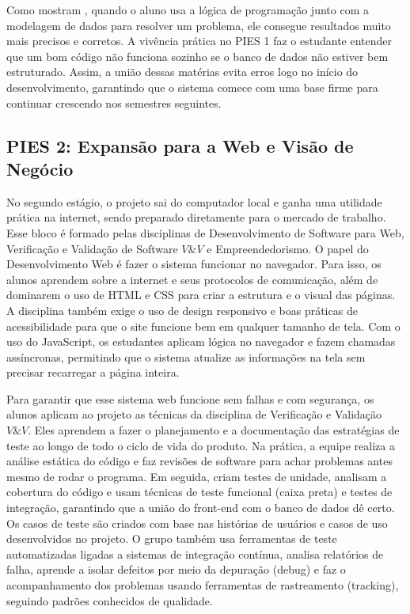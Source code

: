 Como mostram , quando o aluno usa a lógica de programação
junto com a modelagem de dados para resolver um problema, ele consegue
resultados muito mais precisos e corretos. A vivência prática no PIES 1 faz o
estudante entender que um bom código não funciona sozinho se o banco de dados
não estiver bem estruturado. Assim, a união dessas matérias evita erros logo no
início do desenvolvimento, garantindo que o sistema comece com uma base firme
para continuar crescendo nos semestres seguintes.

\subsection{ PIES 2: Expansão para a Web e Visão de Negócio} \label{sec:pies-2}

No segundo estágio, o projeto sai do computador local e ganha uma utilidade
prática na internet, sendo preparado diretamente para o mercado de trabalho.
Esse bloco é formado pelas disciplinas de Desenvolvimento de Software para Web,
Verificação e Validação de Software \(V\&V\) e Empreendedorismo. O papel do
Desenvolvimento Web é fazer o sistema funcionar no navegador. Para isso, os
alunos aprendem sobre a internet e seus protocolos de comunicação, além de
dominarem o uso de HTML e CSS para criar a estrutura e o visual das páginas. A
disciplina também exige o uso de design responsivo e boas práticas de
acessibilidade para que o site funcione bem em qualquer tamanho de tela. Com o
uso do JavaScript, os estudantes aplicam lógica no navegador e fazem chamadas
assíncronas, permitindo que o sistema atualize as informações na tela sem
precisar recarregar a página inteira.

Para garantir que esse sistema web funcione sem falhas e com segurança, os
alunos aplicam ao projeto as técnicas da disciplina de Verificação e Validação
\(V\&V\). Eles aprendem a fazer o planejamento e a documentação das estratégias
de teste ao longo de todo o ciclo de vida do produto. Na prática, a equipe
realiza a análise estática do código e faz revisões de software para achar
problemas antes mesmo de rodar o programa. Em seguida, criam testes de unidade,
analisam a cobertura do código e usam técnicas de teste funcional (caixa preta)
e testes de integração, garantindo que a união do front-end com o banco de
dados dê certo. Os casos de teste são criados com base nas histórias de
usuários e casos de uso desenvolvidos no projeto. O grupo também usa
ferramentas de teste automatizadas ligadas a sistemas de integração contínua,
analisa relatórios de falha, aprende a isolar defeitos por meio da depuração
(debug) e faz o acompanhamento dos problemas usando ferramentas de rastreamento
(tracking), seguindo padrões conhecidos de qualidade.

